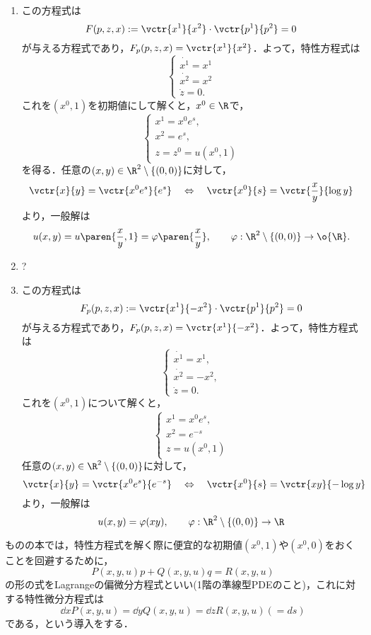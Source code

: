 \documentclass[uplatex,dvipdfmx]{jsarticle}
\begin{document}
\begin{Proof}\mbox{}
    \begin{enumerate}
        \item この方程式は
        \[F(p,z,x):=\vctr{x^1}{x^2}\cdot\vctr{p^1}{p^2}=0\]
        が与える方程式であり，$F_p(p,z,x)=\vctr{x^1}{x^2}$．よって，特性方程式は
        \[\begin{cases}
            \dot{x^1}=x^1\\
            \dot{x^2}=x^2\\
            \dot{z}=0.
        \end{cases}\]
        これを$(x^0,1)$を初期値にして解くと，$x^0\in\R$で，
        \[\begin{cases}
            x^1=x^0e^s,\\
            x^2=e^s,\\
            z=z^0=u(x^0,1)
        \end{cases}\]
        を得る．任意の$(x,y)\in\R^2\setminus\{(0,0)\}$に対して，
        \[\vctr{x}{y}=\vctr{x^0e^s}{e^s}\quad\Leftrightarrow\quad\vctr{x^0}{s}=\vctr{\frac{x}{y}}{\log y}\]
        より，一般解は
        \[u(x,y)=u\paren{\frac{x}{y},1}=\varphi\paren{\frac{x}{y}},\qquad\varphi:\R^2\setminus\{(0,0)\}\to\o{\R}.\]
        \item ?
        \item この方程式は
        \[F_p(p,z,x):=\vctr{x^1}{-x^2}\cdot\vctr{p^1}{p^2}=0\]
        が与える方程式であり，$F_p(p,z,x)=\vctr{x^1}{-x^2}$．よって，特性方程式は
        \[\begin{cases}
            \dot{x^1}=x^1,\\
            \dot{x^2}=-x^2,\\
            \dot{z}=0.
        \end{cases}\]
        これを$(x^0,1)$について解くと，
        \[\begin{cases}
            x^1=x^0e^s,\\
            x^2=e^{-s}\\
            z=u(x^0,1)
        \end{cases}\]
        任意の$(x,y)\in\R^2\setminus\{(0,0)\}$に対して，
        \[\vctr{x}{y}=\vctr{x^0e^s}{e^{-s}}\quad\Leftrightarrow\quad\vctr{x^0}{s}=\vctr{xy}{-\log y}\]
        より，一般解は
        \[u(x,y)=\varphi(xy),\qquad\varphi:\R^2\setminus\{(0,0)\}\to\R\]
    \end{enumerate}
\end{Proof}
\begin{remark*}
    ものの本では，特性方程式を解く際に便宜的な初期値$(x^0,1)$や$(x^0,0)$をおくことを回避するために，
    \[P(x,y,u)p+Q(x,y,u)q=R(x,y,u)\]
    の形の式をLagrangeの偏微分方程式といい(1階の準線型PDEのこと)，これに対する特性微分方程式は
    \[\dd{x}{P(x,y,u)}=\dd{y}{Q(x,y,u)}=\dd{z}{R(x,y,u)}(=ds)\]
    である，という導入をする．
\end{remark*}
\end{document}
